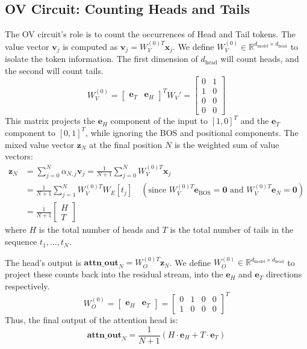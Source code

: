 \documentclass{article}
\begin{document}
\subsection{OV Circuit: Counting Heads and Tails}
The OV circuit's role is to count the occurrences of Head and Tail tokens. The value vector $\mathbf{v}_j$ is computed as $\mathbf{v}_j = W_V^{(0)T} \mathbf{x}_j$. We define $W_V^{(0)} \in \mathbb{R}^{d_{\text{model}} \times d_{\text{head}}}$ to isolate the token information. The first dimension of $d_{\text{head}}$ will count heads, and the second will count tails.
\begin{equation}
    W_V^{(0)} = \begin{bmatrix} \mathbf{e}_T & \mathbf{e}_H \end{bmatrix}^T W_V' =
    \begin{bmatrix}
        0 & 1 \\
        1 & 0 \\
        0 & 0 \\
        0 & 0
    \end{bmatrix}
\end{equation}
This matrix projects the $\mathbf{e}_H$ component of the input to $[1, 0]^T$ and the $\mathbf{e}_T$ component to $[0, 1]^T$, while ignoring the BOS and positional components. The mixed value vector $\mathbf{z}_N$ at the final position $N$ is the weighted sum of value vectors:
\begin{align}
    \mathbf{z}_N &= \sum_{j=0}^{N} \alpha_{N,j} \mathbf{v}_j = \frac{1}{N+1} \sum_{j=0}^{N} W_V^{(0)T} \mathbf{x}_j \\
    &= \frac{1}{N+1} \sum_{j=1}^{N} W_V^{(0)T} W_E[t_j] \quad (\text{since } W_V^{(0)T} \mathbf{e}_{\text{BOS}} = \mathbf{0} \text{ and } W_V^{(0)T} \mathbf{e}_N = \mathbf{0}) \\
    &= \frac{1}{N+1} \begin{bmatrix} H \\ T \end{bmatrix}
\end{align}
where $H$ is the total number of heads and $T$ is the total number of tails in the sequence $t_1, \dots, t_N$.

The head's output is $\mathbf{attn\_out}_N = W_O^{(0)T} \mathbf{z}_N$. We define $W_O^{(0)} \in \mathbb{R}^{d_{\text{model}} \times d_{\text{head}}}$ to project these counts back into the residual stream, into the $\mathbf{e}_H$ and $\mathbf{e}_T$ directions respectively.
\begin{equation}
    W_O^{(0)} = \begin{bmatrix} \mathbf{e}_H & \mathbf{e}_T \end{bmatrix} = \begin{bmatrix}
        0 & 1 & 0 & 0 \\
        1 & 0 & 0 & 0
    \end{bmatrix}^T
\end{equation}
Thus, the final output of the attention head is:
\begin{equation}
    \mathbf{attn\_out}_N = \frac{1}{N+1} (H \cdot \mathbf{e}_H + T \cdot \mathbf{e}_T)
\end{equation}
\end{document}
